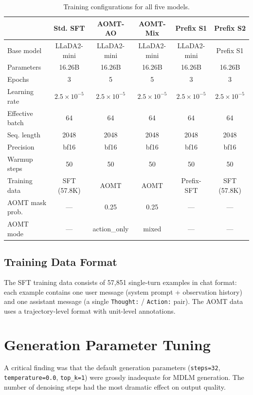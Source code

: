 \documentclass[11pt,a4paper]{article}
\begin{document}
\begin{table}[h]
\centering
\caption{Training configurations for all five models.}
\label{tab:config}
\begin{tabular}{lccccc}
\toprule
& \textbf{Std. SFT} & \textbf{AOMT-AO} & \textbf{AOMT-Mix} & \textbf{Prefix S1} & \textbf{Prefix S2} \\
\midrule
Base model & LLaDA2-mini & LLaDA2-mini & LLaDA2-mini & LLaDA2-mini & Prefix S1 \\
Parameters & 16.26B & 16.26B & 16.26B & 16.26B & 16.26B \\
Epochs & 3 & 5 & 5 & 3 & 3 \\
Learning rate & $2.5 \times 10^{-5}$ & $2.5 \times 10^{-5}$ & $2.5 \times 10^{-5}$ & $2.5 \times 10^{-5}$ & $2.5 \times 10^{-5}$ \\
Effective batch & 64 & 64 & 64 & 64 & 64 \\
Seq. length & 2048 & 2048 & 2048 & 2048 & 2048 \\
Precision & bf16 & bf16 & bf16 & bf16 & bf16 \\
Warmup steps & 50 & 50 & 50 & 50 & 50 \\
\midrule
Training data & SFT (57.8K) & AOMT & AOMT & Prefix-SFT & SFT (57.8K) \\
AOMT mask prob. & --- & 0.25 & 0.25 & --- & --- \\
AOMT mode & --- & action\_only & mixed & --- & --- \\
\bottomrule
\end{tabular}
\end{table}

\subsection{Training Data Format}
The SFT training data consists of 57,851 single-turn examples in chat format: each example contains one user message (system prompt + observation history) and one assistant message (a single \texttt{Thought:} / \texttt{Action:} pair). The AOMT data uses a trajectory-level format with unit-level annotations.

\section{Generation Parameter Tuning}

A critical finding was that the default generation parameters (\texttt{steps=32}, \texttt{temperature=0.0}, \texttt{top\_k=1}) were grossly inadequate for MDLM generation. The number of denoising steps had the most dramatic effect on output quality.
\end{document}
